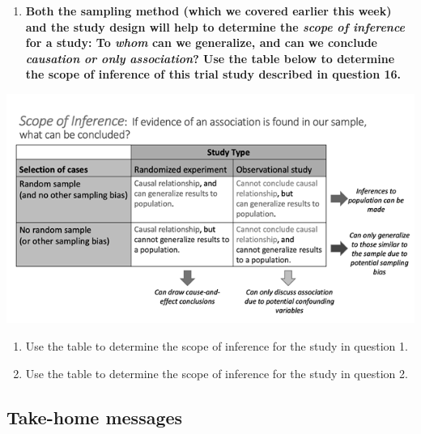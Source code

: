 \documentclass[
]{report}
\providecommand{\tightlist}{%
  \setlength{\itemsep}{0pt}\setlength{\parskip}{0pt}}
\begin{document}
\newpage

\begin{enumerate}
\def\labelenumi{\arabic{enumi}.}
\setcounter{enumi}{16}
\tightlist
\item
  \textbf{Both the sampling method (which we covered earlier this week) and the study design will help to determine the \emph{scope of inference} for a study: To \emph{whom} can we generalize, and can we conclude \emph{causation or only association}? Use the table below to determine the scope of inference of this trial study described in question 16.}
  \vspace{0.3in}
\end{enumerate}

\begin{center}\includegraphics[width=0.75\linewidth]{images/ScopeOfInferenceGreyscale} \end{center}

\begin{enumerate}
\def\labelenumi{\arabic{enumi}.}
\setcounter{enumi}{17}
\item
  Use the table to determine the scope of inference for the study in question 1.
  \vspace{0.3in}
\item
  Use the table to determine the scope of inference for the study in question 2.
  \vspace{0.3in}
\end{enumerate}

\hypertarget{take-home-messages-3}{%
\subsection{Take-home messages}\label{take-home-messages-3}}
\end{document}

